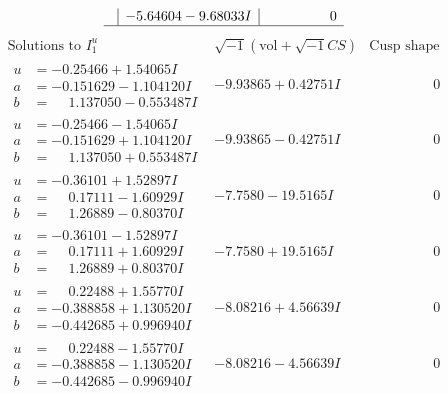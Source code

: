 \documentclass[1p]{elsarticle_modified}
\theoremstyle{definition}
\newcommand{\I}{\sqrt{-1}}
\begin{document}
$$\begin{array}{c|c|c}
 & -5.64604 - 9.68033 I & \phantom{-0.000000 } 0\\
 \hline 
 \end{array}$$\newpage$$\begin{array}{c|c|c}  
\text{Solutions to }I^u_{1}& \I (\text{vol} + \sqrt{-1}CS) & \text{Cusp shape}\\
 \hline 
\begin{aligned}
u &= -0.25466 + 1.54065 I \\
a &= -0.151629 - 1.104120 I \\
b &= \phantom{-}1.137050 - 0.553487 I\end{aligned}
 & -9.93865 + 0.42751 I & \phantom{-0.000000 } 0 \\ \hline\begin{aligned}
u &= -0.25466 - 1.54065 I \\
a &= -0.151629 + 1.104120 I \\
b &= \phantom{-}1.137050 + 0.553487 I\end{aligned}
 & -9.93865 - 0.42751 I & \phantom{-0.000000 } 0 \\ \hline\begin{aligned}
u &= -0.36101 + 1.52897 I \\
a &= \phantom{-}0.17111 - 1.60929 I \\
b &= \phantom{-}1.26889 - 0.80370 I\end{aligned}
 & -7.7580 - 19.5165 I & \phantom{-0.000000 } 0 \\ \hline\begin{aligned}
u &= -0.36101 - 1.52897 I \\
a &= \phantom{-}0.17111 + 1.60929 I \\
b &= \phantom{-}1.26889 + 0.80370 I\end{aligned}
 & -7.7580 + 19.5165 I & \phantom{-0.000000 } 0 \\ \hline\begin{aligned}
u &= \phantom{-}0.22488 + 1.55770 I \\
a &= -0.388858 + 1.130520 I \\
b &= -0.442685 + 0.996940 I\end{aligned}
 & -8.08216 + 4.56639 I & \phantom{-0.000000 } 0 \\ \hline\begin{aligned}
u &= \phantom{-}0.22488 - 1.55770 I \\
a &= -0.388858 - 1.130520 I \\
b &= -0.442685 - 0.996940 I\end{aligned}
 & -8.08216 - 4.56639 I & \phantom{-0.000000 } 0 \\ \hline\begin{aligned}

\end{aligned}
\end{array}$$
\end{document}
